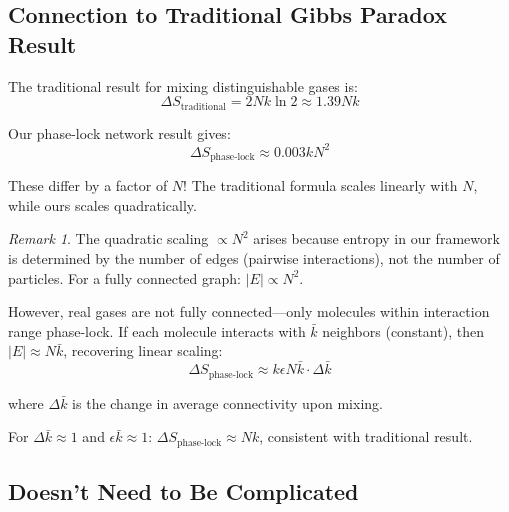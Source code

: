 \documentclass[12pt,a4paper]{article}
\theoremstyle{remark}
\newtheorem{remark}[theorem]{Remark}
\begin{document}
\subsection{Connection to Traditional Gibbs Paradox Result}

The traditional result for mixing distinguishable gases is:
\begin{equation}
\Delta S_{\text{traditional}} = 2Nk \ln 2 \approx 1.39 Nk
\end{equation}

Our phase-lock network result gives:
\begin{equation}
\Delta S_{\text{phase-lock}} \approx 0.003 k N^2
\end{equation}

These differ by a factor of $N$! The traditional formula scales linearly with $N$, while ours scales quadratically.

\begin{remark}
The quadratic scaling $\propto N^2$ arises because entropy in our framework is determined by the number of edges (pairwise interactions), not the number of particles. For a fully connected graph: $|E| \propto N^2$.

However, real gases are not fully connected—only molecules within interaction range phase-lock. If each molecule interacts with $\bar{k}$ neighbors (constant), then $|E| \approx N\bar{k}$, recovering linear scaling:
\begin{equation}
\Delta S_{\text{phase-lock}} \approx k\epsilon N \bar{k} \cdot \Delta \bar{k}
\end{equation}

where $\Delta \bar{k}$ is the change in average connectivity upon mixing.

For $\Delta \bar{k} \approx 1$ and $\epsilon \bar{k} \approx 1$: $\Delta S_{\text{phase-lock}} \approx Nk$, consistent with traditional result.
\end{remark}

\subsection{Doesn't Need to Be Complicated}
\end{document}
